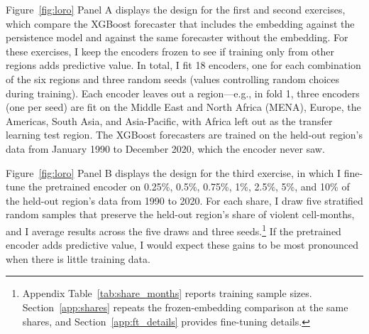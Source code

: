 \documentclass[11pt, letterpaper]{article}
\begin{document}
Figure~\ref{fig:loro} Panel A displays the design for the first and second exercises, which compare the XGBoost forecaster that includes the embedding against the persistence model and against the same forecaster without the embedding. For these exercises, I keep the encoders frozen to see if training only from other regions adds predictive value. In total, I fit 18 encoders, one for each combination of the six regions and three random seeds (values controlling random choices during training). Each encoder leaves out a region---e.g., in fold 1, three encoders (one per seed) are fit on the Middle East and North Africa (MENA), Europe, the Americas, South Asia, and Asia-Pacific, with Africa left out as the transfer learning test region. The XGBoost forecasters are trained on the held-out region's data from January 1990 to December 2020, which the encoder never saw. 



Figure~\ref{fig:loro} Panel B displays the design for the third exercise, in which I fine-tune the pretrained encoder on 0.25\%, 0.5\%, 0.75\%, 1\%, 2.5\%, 5\%, and 10\% of the held-out region's data from 1990 to 2020. For each share, I draw five stratified random samples that preserve the held-out region's share of violent cell-months, and I average results across the five draws and three seeds.\footnote{Appendix Table~\ref{tab:share_months} reports training sample sizes. Section~\ref{app:shares} repeats the frozen-embedding comparison at the same shares, and Section~\ref{app:ft_details} provides fine-tuning details.} If the pretrained encoder adds predictive value, I would expect these gains to be most pronounced when there is little training data. 
\end{document}
